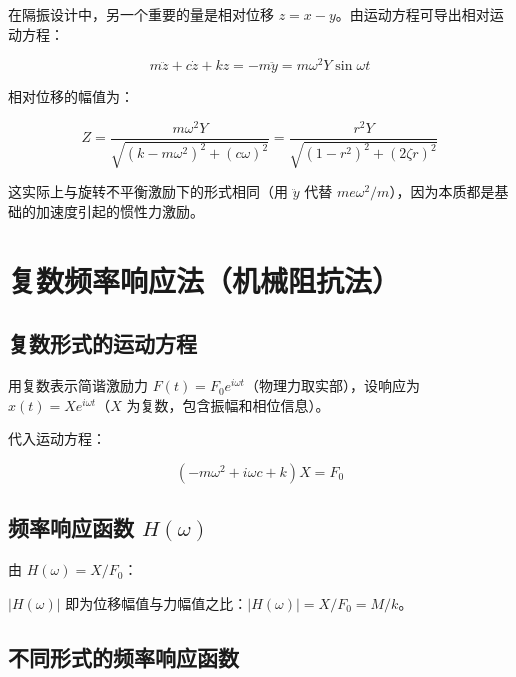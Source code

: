在隔振设计中，另一个重要的量是相对位移 $z = x - y$。由运动方程可导出相对运动方程：
\begin{myformula}
    \[
    m\ddot{z} + c\dot{z} + kz = -m\ddot{y} = m\omega^2 Y\sin\omega t
    \]
\end{myformula}

相对位移的幅值为：
\begin{myformula}
    \[
    Z = \frac{m\omega^2 Y}{\sqrt{(k-m\omega^2)^2 + (c\omega)^2}}
      = \frac{r^2 Y}{\sqrt{(1-r^2)^2 + (2\zeta r)^2}}
    \]
\end{myformula}

这实际上与旋转不平衡激励下的形式相同（用 $\ddot{y}$ 代替 $me\omega^2/m$），因为本质都是基础的加速度引起的惯性力激励。

\section{复数频率响应法（机械阻抗法）}

\subsection{复数形式的运动方程}

用复数表示简谐激励力 $F(t) = F_0 e^{i\omega t}$（物理力取实部），设响应为 $x(t) = Xe^{i\omega t}$（$X$ 为复数，包含振幅和相位信息）。

代入运动方程：
\begin{myformula}
    \[
    (-m\omega^2 + i\omega c + k)X = F_0
    \]
\end{myformula}

\subsection{频率响应函数 $H(\omega)$}

由 $H(\omega) = X/F_0$：
\begin{myformula}
    \end{myformula}

$|H(\omega)|$ 即为位移幅值与力幅值之比：$|H(\omega)| = X/F_0 = M/k$。

\subsection{不同形式的频率响应函数}

